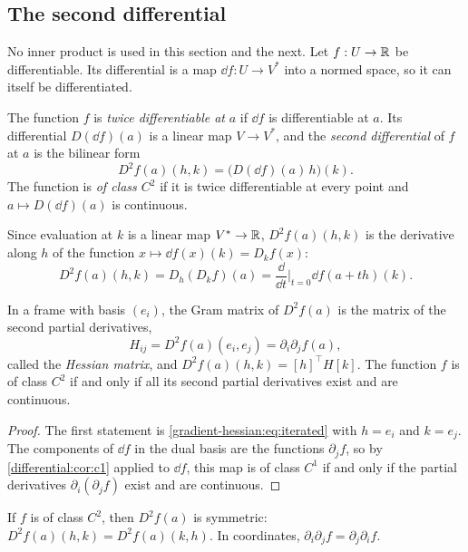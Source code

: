 \begin{notechapter}
\section{The second differential}\label{gradient-hessian:sec:second}

No inner product is used in this section and the next. Let $f:U\to\mathbb{R}$ be
differentiable. Its differential is a map $\dd f:U\to V^*$ into a normed
space, so it can itself be differentiated.

\begin{definition}\label{gradient-hessian:def:second}
The function $f$ is \emph{twice differentiable at} $a$ if $\dd f$ is
differentiable at $a$. Its differential $D(\dd f)(a)$ is a linear map
$V\to V^*$, and the \emph{second differential} of $f$ at $a$ is the
bilinear form
\[
  D^2f(a)(h, k) = \bigl(D(\dd f)(a)\,h\bigr)(k) .
\]
The function is \emph{of class $C^2$} if it is twice differentiable at
every point and $a\mapsto D(\dd f)(a)$ is continuous.
\end{definition}

Since evaluation at $k$ is a linear map $V^*\to\mathbb{R}$,
$D^2f(a)(h, k)$ is the derivative along $h$ of the function
$x\mapsto\dd f(x)(k) = D_kf(x)$:
\begin{equation}\label{gradient-hessian:eq:iterated}
  D^2f(a)(h, k) = D_h(D_kf)(a)
  = \frac{\dd}{\dd t}\Big|_{t=0}\dd f(a + th)(k) .
\end{equation}

\begin{proposition}\label{gradient-hessian:prop:matrix}
In a frame with basis $(e_i)$, the Gram matrix of $D^2f(a)$ is the matrix
of the second partial derivatives,
\[
  H_{ij} = D^2f(a)(e_i, e_j) = \partial_i\partial_jf(a) ,
\]
called the \emph{Hessian matrix}, and
$D^2f(a)(h, k) = [h]^\top H[k]$. The function $f$ is of class $C^2$ if
and only if all its second partial derivatives exist and are continuous.
\end{proposition}

\begin{proof}
The first statement is \eqref{gradient-hessian:eq:iterated} with
$h = e_i$ and $k = e_j$. The components of $\dd f$ in the dual basis are
the functions $\partial_jf$, so by \cref{differential:cor:c1} applied to
$\dd f$, this map is of class $C^1$ if and only if the partial derivatives
$\partial_i(\partial_jf)$ exist and are continuous.
\end{proof}

\begin{theorem}
\label{gradient-hessian:thm:schwarz}
If $f$ is of class $C^2$, then $D^2f(a)$ is symmetric:
$D^2f(a)(h, k) = D^2f(a)(k, h)$. In coordinates,
$\partial_i\partial_jf = \partial_j\partial_if$.
\end{theorem}


\end{notechapter}
